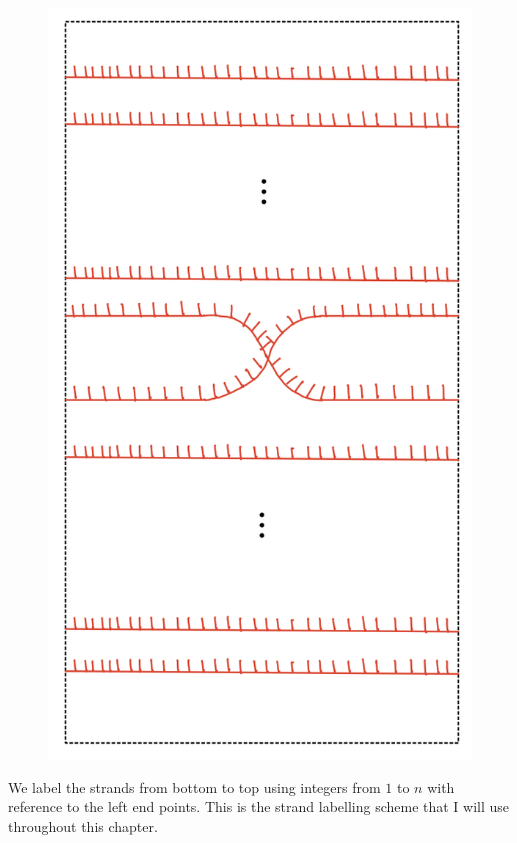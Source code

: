 \begin{figure}[H] 
    \centering
    \includegraphics[scale = 0.55]{diagrams/natural_alternating_diagrams/8.png} 
    \caption{}
    \label{fig:your-label}
\end{figure}


We label the strands from bottom to top using integers from $1$ to $n$ with reference to the left end points. This is the strand labelling scheme that I will use throughout this chapter.


